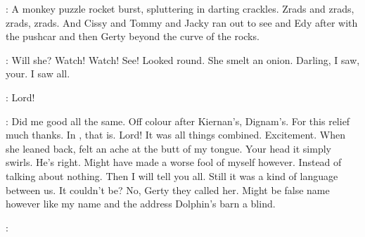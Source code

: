 :
A monkey puzzle rocket burst,
spluttering in darting crackles.
Zrads
and zrads,
zrads,
zrads.
And Cissy and Tommy and Jacky ran out to see
and Edy after with the pushcar and then Gerty beyond the curve of the
rocks.

\Bloom:
Will she?
Watch!
Watch!
See!
Looked round.
She smelt an onion.
Darling,
I saw,
your.
I saw all.

\Bloom:
Lord!

\Bloom:
Did me good all the same.
Off colour after Kiernan's,
Dignam's.
For
this relief much thanks.
In ,
that is.
Lord!
It was all things
combined.
Excitement.
When she leaned back,
felt an ache at the butt of my
tongue.
Your head it simply swirls.
He's right.
Might have made a worse
fool of myself however.
Instead of talking about nothing.
Then I will tell
you all.
Still it was a kind of language between us.
It couldn't be?
No,
Gerty they called her.
Might be false name however like my name and the
address Dolphin's barn a blind.

:

